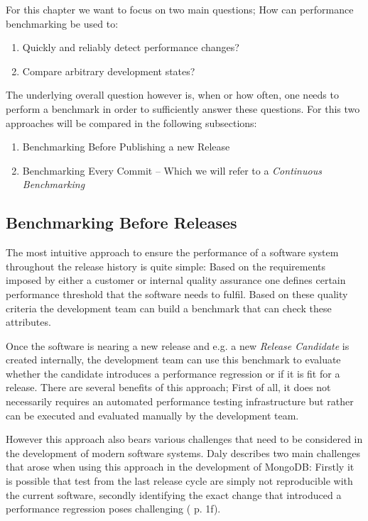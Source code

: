 \documentclass[	runningheads,
				a4paper]{llncs}
\begin{document}
	For this chapter we want to focus on two main questions; How can performance benchmarking be used to:
	\begin{enumerate}
		\item Quickly and reliably detect performance changes?
		\item Compare arbitrary development states?
	\end{enumerate}

	The underlying overall question however is, when or how often, one needs to perform a benchmark in order to sufficiently answer these questions. For this two approaches will be compared in the following subsections:
	\begin{enumerate}
		\item Benchmarking Before Publishing a new Release
		\item Benchmarking Every Commit -- Which we will refer to a \textit{Continuous Benchmarking}
	\end{enumerate}

	\subsection{Benchmarking Before Releases}
	\label{ssec:bench_rel}
	The most intuitive approach to ensure the performance of a software system throughout the release history is quite simple: Based on the requirements imposed by either a customer or internal quality assurance one defines certain performance threshold that the software needs to fulfil. Based on these quality criteria the development team can build a benchmark that can check these attributes.

	Once the software is nearing a new release and e.g. a new \textit{Release Candidate} is created internally, the development team can use this benchmark to evaluate whether the candidate introduces a performance regression or if it is fit for a release. There are several benefits of this approach; First of all, it does not necessarily requires an automated performance testing infrastructure but rather can be executed and evaluated manually by the development team. 

	However this approach also bears various challenges that need to be considered in the development of modern software systems. Daly describes two main challenges that arose when using this approach in the development of MongoDB: Firstly it is possible that test from the last release cycle are simply not reproducible with the current software, secondly identifying the exact change that introduced a performance regression poses challenging (\cite{daly2021} p. 1f).
\end{document}
